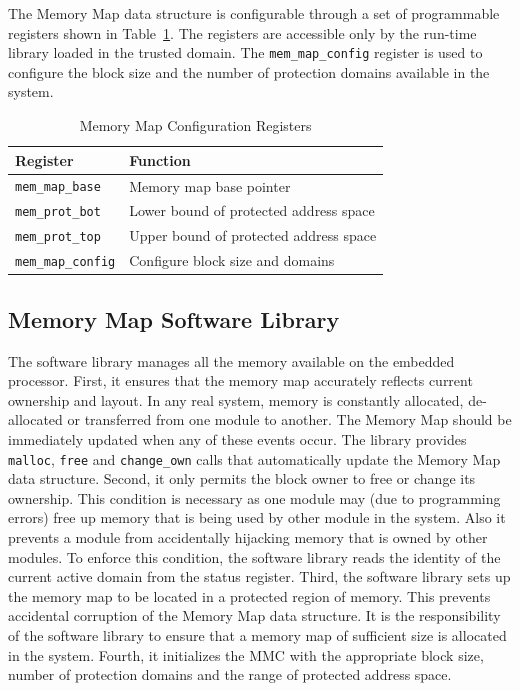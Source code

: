 %
%
The Memory Map data structure is configurable through a set of programmable registers shown in Table~\ref{tab:mmap_config}.
%
The registers are accessible only by the run-time library loaded in the trusted domain.
%
The \texttt{mem\_map\_config} register is used to configure the block size and the number of protection domains available in the system.
%
\begin{table}[htdp]
\centering
\small{
\begin{tabular}{|l|l|}
	\hline
	Register & Function\\
	\hline
	\texttt{mem\_map\_base} & Memory map base pointer \\
	\texttt{mem\_prot\_bot} & Lower bound of protected address space\\
	\texttt{mem\_prot\_top} & Upper bound of protected address space\\
	\texttt{mem\_map\_config} & Configure block size and domains\\
	\hline
\end{tabular}}
\caption{Memory Map Configuration Registers}
\label{tab:mmap_config}
\end{table}
%
\subsection{Memory Map Software Library}
\label{subsec:mmap_for_protection}
%
The software library manages all the memory available on the embedded processor.
%
First, it ensures that the memory map accurately reflects current ownership and layout.
%
In any real system, memory is constantly allocated, de-allocated or transferred from one module to another.
%
The Memory Map should be immediately updated when any of these events occur.
%
The library provides \texttt{malloc}, \texttt{free} and \texttt{change\_own} calls that automatically update the  Memory Map data structure. 
%
Second, it only permits the  block owner to free or change its ownership.
%
This condition is necessary as one module may (due to programming errors) free up memory that is being used by other module in the system.
%
Also it prevents a module from accidentally hijacking memory that is owned by other modules.
%
To enforce this condition, the software library reads the identity of the current active domain from the status register.
%
%
Third, the software library sets up the memory map to be located in a protected region of memory.
%
This prevents accidental corruption of the Memory Map data structure.
%
It is the responsibility of the software library to ensure that a memory map of sufficient size is allocated in the system.
%
Fourth, it initializes the MMC with the appropriate block size, number of protection domains and the range of protected address space.
%





